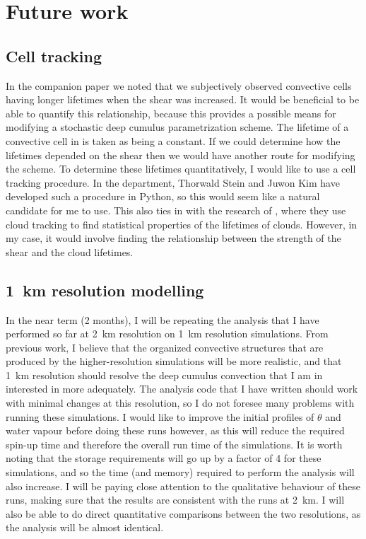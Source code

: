\documentclass[11pt,a4paper]{article}
\begin{document}
\section{Future work}

\subsection{Cell tracking}
\label{sec:cell_tracking}

In the companion paper we noted that we subjectively observed convective cells having longer lifetimes when the shear was increased. It would be beneficial to be able to quantify this relationship, because this provides a possible means for modifying a stochastic deep cumulus parametrization scheme. The lifetime of a convective cell in \cite{plant2008stochastic} is taken as being a constant. If we could determine how the lifetimes depended on the shear then we would have another route for modifying the scheme. To determine these lifetimes quantitatively, I would like to use a cell tracking procedure. In the department, Thorwald Stein and Juwon Kim have developed such a procedure in Python, so this would seem like a natural candidate for me to use. This also ties in with the research of \cite{plant2009statistical}, where they use cloud tracking to find statistical properties of the lifetimes of clouds. However, in my case, it would involve finding the relationship between the strength of the shear and the cloud lifetimes.

\subsection{\SI{1}{km} resolution modelling}
\label{sec:1km_res}

In the near term (2 months), I will be repeating the analysis that I have performed so far at \SI{2}{km} resolution on \SI{1}{km} resolution simulations. From previous work, I believe that the organized convective structures that are produced by the higher-resolution simulations will be more realistic, and that \SI{1}{km} resolution should resolve the deep cumulus convection that I am in interested in more adequately. The analysis code that I have written should work with minimal changes at this resolution, so I do not foresee many problems with running these simulations. I would like to improve the initial profiles of $\theta$ and water vapour before doing these runs however, as this will reduce the required spin-up time and therefore the overall run time of the simulations. It is worth noting that the storage requirements will go up by a factor of 4 for these simulations, and so the time (and memory) required to perform the analysis will also increase. I will be paying close attention to the qualitative behaviour of these runs, making sure that the results are consistent with the runs at \SI{2}{km}. I will also be able to do direct quantitative comparisons between the two resolutions, as the analysis will be almost identical.
\end{document}
